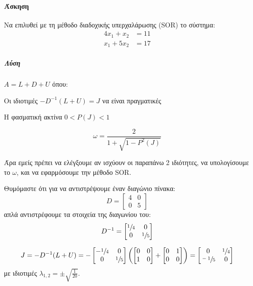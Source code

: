 \documentclass[11pt,a4paper,notitlepage,fleqn,final]{article}
\begin{document}
\paragraph{Άσκηση}
Να επιλυθεί με τη μέθοδο διαδοχικής υπερχαλάρωσης (SOR) το σύστημα:
\begin{align*}
	4x_1+x_2 &= 11 \\
	x_1+5x_2 &= 17
\end{align*}
\subparagraph{Λύση}
\( A= L+D+U \) όπου:
\begin{enumroman}
	\item Οι ιδιοτιμές \( -D^{-1}(L+U) = J \) να είναι πραγματικές
	\item Η φασματική ακτίνα \( 0 < P(J) < 1 \)
\end{enumroman}
\[
\omega = \frac{2}{1+\sqrt{1-P^2(J)}}
\]

Άρα εμείς πρέπει να ελέγξουμε αν ισχύουν οι παραπάνω 2 ιδιότητες, να
υπολογίσουμε το \( \omega \), και να εφαρμόσουμε την μέθοδο SOR.

\begin{infobox}{}
	Θυμόμαστε ότι για να αντιστρέψουμε έναν διαγώνιο πίνακα:
	\[
	D = \left[\begin{matrix}
	4&0\\0&5
	\end{matrix}\right]
	\]
	απλά αντιστρέφουμε τα στοιχεία της διαγωνίου του:
	\[
	D^{-1} = \left[\begin{matrix}
	\sfrac{1}{4} & 0 \\ 0 & \sfrac{1}{5}
	\end{matrix}\right]
	\]
\end{infobox}

\begin{align*}
	J = -D^{-1} (L+U) = -\left[\begin{matrix}
	-\sfrac{1}{4}  & 0 \\ 0 & \sfrac{1}{5}
	\end{matrix}
	\right]\left(\left[\begin{matrix}
	0&0\\1&0
	\end{matrix}\right] + \left[\begin{matrix}
	0 & 1 \\ 0 & 0
	\end{matrix}\right]\right) = \left[\begin{matrix}
	0 & \sfrac{1}{4}  \\ \sfrac{-1}{5} & 0
	\end{matrix}\right]
\end{align*}
με ιδιοτιμές \( \lambda_{1,2} = \pm \sqrt{\frac{1}{20}} \).
\end{document}

